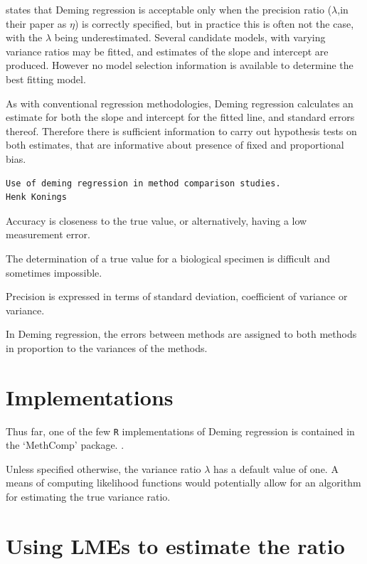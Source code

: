 \documentclass[12pt, a4paper]{report}
\theoremstyle{plain}
\theoremstyle{definition}
\theoremstyle{remark}
\begin{document}
\citet{CarollRupert} states that Deming
regression is acceptable only when the precision ratio ($\lambda$,in their paper as $\eta$) is correctly specified, but in practice this is often not the case, with the $\lambda$ being underestimated. Several candidate models, with varying variance ratios may be fitted, and estimates of the slope and intercept are produced. However no model selection information is available to determine the best fitting model.

As with conventional regression methodologies, Deming regression calculates an estimate for both the slope and intercept for the
fitted line, and standard errors thereof. Therefore there is sufficient information to carry out hypothesis tests on both
estimates, that are informative about presence of fixed and proportional bias.



\begin{verbatim}
Use of deming regression in method comparison studies.
Henk Konings
\end{verbatim}

Accuracy is closeness to the true value, or alternatively, having a low measurement error.

The determination of a true value for a biological specimen is difficult and sometimes impossible.

Precision is expressed in terms of standard deviation, coefficient of variance or variance.

In Deming regression, the errors between methods are assigned to both methods in proportion to the variances of the methods.





\section{Implementations}
Thus far, one of the few \texttt{R} implementations of Deming regression is contained in the `MethComp' package. \citep{BXC2008}.

Unless specified otherwise, the variance ratio $\lambda$ has a default value of one. A means of computing likelihood functions would potentially allow for an algorithm for estimating the true variance ratio.



\section{Using LMEs to estimate the ratio}
\end{document}

